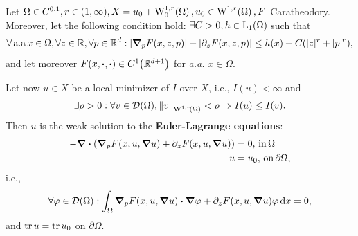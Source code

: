 \documentclass{article}
\begin{document}
\begin{lemma}
	Let $\Omega \in C^{0,1}, r \in(1,\infty), X = u_0 + \WkpzeroSet[1][r]{\Omega}, u_0 \in \WkpSet[1][r]{\Omega}, F$ Caratheodory. Moreover, let the following condition hold: $\exists C>0, h \in \LpSet[1]{\Omega}$ such that 
	\[
		 \forall \, \text{a.a} \, x \in \Omega, \forall z \in {\mathbb R}, \forall p \in {\mathbb R}^d: |\grad_p F(x,z,p)|+|\partial_{z} F(x,z,p)| \leq h(x) + C\qty(|z|^r + |p|^r),
	\]
	and let moreover $F(x,\vdot, \vdot) \in C^1\qty(\R^{d+1})$ for \textit{a.a.} $x \in \Omega.$

	Let now $u \in X$ be a local minimizer of $I$ over $X$, i.e., $I(u) < \infty$ and
	\[
		\exists \rho>0: \forall v \in \mathcal{D}\qty(\Omega), \norm{v}_{\WkpSet[1][r]{\Omega}} < \rho \Rightarrow I(u) \leq I(v).
	\]
	Then $u$ is the weak solution to the \textbf{Euler-Lagrange equations}:
		\begin{align*}
			- \divergence{\qty(\grad_p F\qty(x, u, \grad u)+ \partial_{z}F\qty(x, u, \grad u))} &= 0, \, \text{in} \, \Omega \\
			u &= u_0, \, \text{on} \, \partial \Omega,
		\end{align*}
	i.e.,
	\begin{align*}
		\forall \varphi \in \mathcal{D}\qty(\Omega): \int_{\Omega}\grad_p F\qty(x, u, \grad u) \vdot \grad \varphi + \partial_{z}F\qty(x, u, \grad u) \varphi \dd{x} = 0,\\
	\end{align*} 
	and $\trace u = \trace u_0$ on $\partial \Omega.$
\end{lemma}
\end{document}

